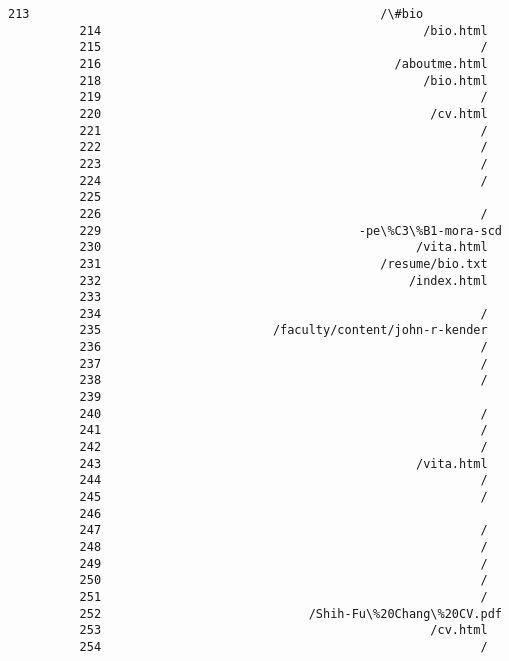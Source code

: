 \documentclass[11pt]{article}
\begin{document}
\begin{Verbatim}[commandchars=\\\{\}]
          213                                                 /\#bio
          214                                             /bio.html
          215                                                     /
          216                                         /aboutme.html
          218                                             /bio.html
          219                                                     /
          220                                              /cv.html
          221                                                     /
          222                                                     /
          223                                                     /
          224                                                     /
          225                                                      
          226                                                     /
          229                                    -pe\%C3\%B1-mora-scd
          230                                            /vita.html
          231                                       /resume/bio.txt
          232                                           /index.html
          233                                                      
          234                                                     /
          235                        /faculty/content/john-r-kender
          236                                                     /
          237                                                     /
          238                                                     /
          239                                                      
          240                                                     /
          241                                                     /
          242                                                     /
          243                                            /vita.html
          244                                                     /
          245                                                     /
          246                                                      
          247                                                     /
          248                                                     /
          249                                                     /
          250                                                     /
          251                                                     /
          252                             /Shih-Fu\%20Chang\%20CV.pdf
          253                                              /cv.html
          254                                                     /

\end{Verbatim}
\end{document}
